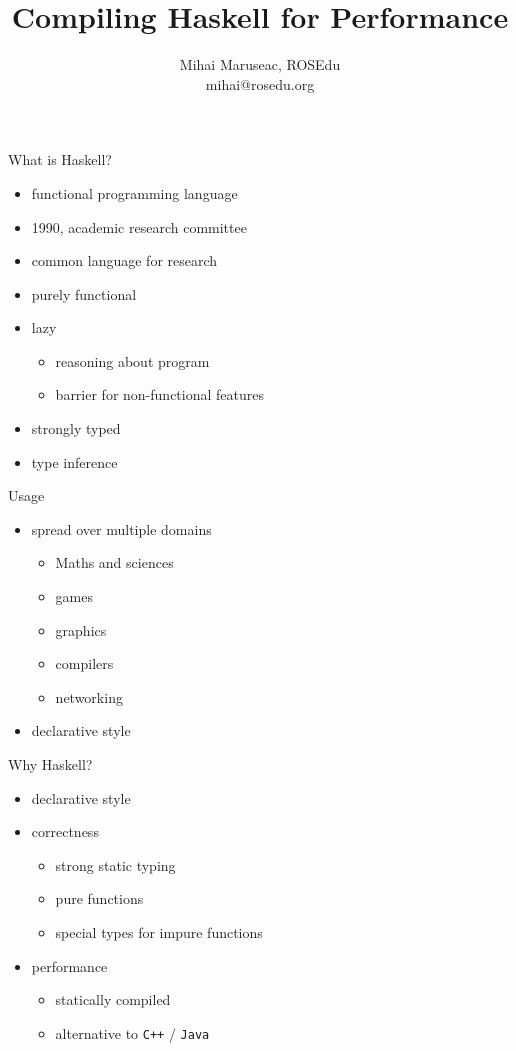 \documentclass{beamer}
\title{Compiling Haskell for Performance}
\author{Mihai Maruseac, ROSEdu\\mihai@rosedu.org}
\begin{document}
\maketitle

\begin{frame}{What is Haskell?}
  \begin{itemize}
    \item functional programming language
    \item 1990, academic research committee
    \item common language for research
    \pause
    \item purely functional
    \item lazy
    \begin{itemize}
      \item reasoning about program
      \item barrier for non-functional features
    \end{itemize}
    \pause
    \item strongly typed
    \item type inference
  \end{itemize}
\end{frame}

\begin{frame}{Usage}
  \begin{itemize}
    \item spread over multiple domains
    \begin{itemize}
      \item Maths and sciences
      \item games
      \item graphics
      \item compilers
      \item networking
    \end{itemize}
    \pause
    \item declarative style
  \end{itemize}
  
\end{frame}

\begin{frame}{Why Haskell?}
  \begin{itemize}
    \item declarative style
    \pause
    \item correctness
    \begin{itemize}
      \item strong static typing
      \item pure functions
      \item special types for impure functions
    \end{itemize}
    \pause
    \item performance
    \begin{itemize}
      \item statically compiled
      \item alternative to \texttt{C++} / \texttt{Java}
    \end{itemize}
  \end{itemize}
\end{frame}
\end{document}
